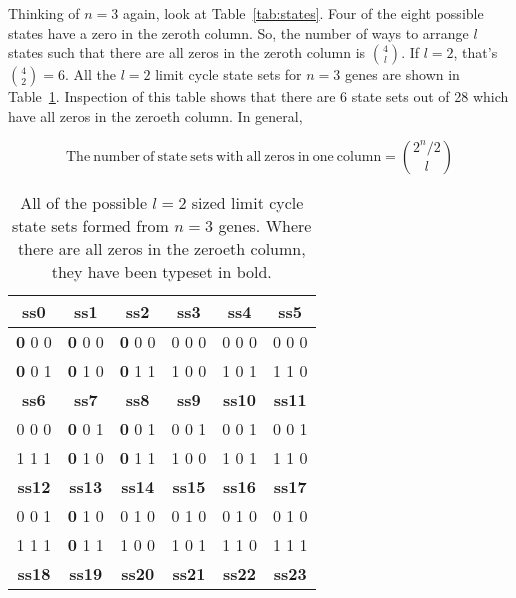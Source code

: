 \documentclass[11pt, a4paper]{article}
\begin{document}
Thinking of $n=3$ again, look at Table~\ref{tab:states}. Four of the
eight possible states have a zero in the zeroth column. So, the number
of ways to arrange $l$ states such that there are all zeros in the
zeroth column is $\binom{4}{l}$. If $l=2$, that's
$\binom{4}{2}=6$. All the $l=2$ limit cycle state sets for $n=3$ genes
are shown in Table~\ref{tab:n3l2}. Inspection of this table shows that
there are 6 state sets out of 28 which have all zeros in the zeroeth
column. In general,

\begin{equation}
\mathrm{The~number~of~state~sets~with~all~zeros~in~one~column} = \binom{2^n/2}{l}
\end{equation}


\begin{table}[h!]
  \begin{center}
    \caption{All of the possible $l=2$ sized limit cycle state sets formed from
    $n=3$ genes. Where there are all zeros in the zeroeth column, they
    have been typeset in bold.}
    \label{tab:n3l2}
    \begin{tabular}{c|c|c|c|c|c}
      \textbf{ss0} & \textbf{ss1} & \textbf{ss2} & \textbf{ss3} &\textbf{ss4} & \textbf{ss5} \\
      \hline
      \textbf{0} 0 0       & \textbf{0} 0 0       & \textbf{0} 0 0       & 0 0 0       & 0 0 0      & 0 0 0       \\
      \textbf{0} 0 1       & \textbf{0} 1 0       & \textbf{0} 1 1       & 1 0 0       & 1 0 1      & 1 1 0       \\
      \hline
      \textbf{ss6} & \textbf{ss7} & \textbf{ss8} & \textbf{ss9} &\textbf{ss10} & \textbf{ss11} \\
      \hline
      0 0 0       & \textbf{0} 0 1       & \textbf{0} 0 1       & 0 0 1       & 0 0 1      & 0 0 1       \\
      1 1 1       & \textbf{0} 1 0       & \textbf{0} 1 1       & 1 0 0       & 1 0 1      & 1 1 0       \\
      \hline
      \textbf{ss12} & \textbf{ss13} & \textbf{ss14} & \textbf{ss15} &\textbf{ss16} & \textbf{ss17} \\
      \hline
      0 0 1       & \textbf{0} 1 0       & 0 1 0       & 0 1 0       & 0 1 0      & 0 1 0       \\
      1 1 1       & \textbf{0} 1 1       & 1 0 0       & 1 0 1       & 1 1 0      & 1 1 1       \\
      \hline
      \textbf{ss18} & \textbf{ss19} & \textbf{ss20} & \textbf{ss21} &\textbf{ss22} & \textbf{ss23} \\

\end{tabular}
\end{center}
\end{table}
\end{document}
